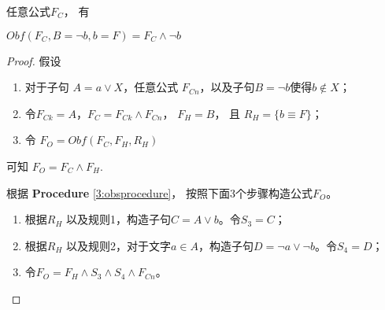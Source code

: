 \begin{lemma}\label{3:UNSSE-lemma}
任意公式$F_C$， 有

 \textbf{$Obf(F_C,B=\neg b,{b=F})=F_C\wedge \neg b$}
\end{lemma}
 \begin{proof}
假设
 \begin{enumerate}
 \item 对于子句 $A=a\vee X$，任意公式 $F_{Cn}$，以及子句$B=\neg b$使得$b\notin X$；
 \item 令$F_{Ck} =A$，$F_C=F_{Ck} \wedge F_{Cn}$， $F_H=B$， 且 $R_H=\{b\equiv F\}$；
 \item 令 $F_O=Obf(F_C,F_H,R_H)$
 \end{enumerate}

可知 $F_O=F_C\wedge F_H$.

 根据 \textbf{Procedure} \ref{3:obsprocedure}， 按照下面3个步骤构造公式$F_O$。
 \begin{enumerate}
 \item 根据$R_H$ 以及规则1，构造子句$C=A\vee b$。令$S_3=C$；
 \item 根据$R_H$ 以及规则2，对于文字$a\in A$，构造子句$D=\neg a\vee \neg b$。令$S_4=D$；
 \item 令$F_O=F_H \wedge S_3\wedge S_4 \wedge F_{Cn} $。
 \end{enumerate}


\end{proof}
